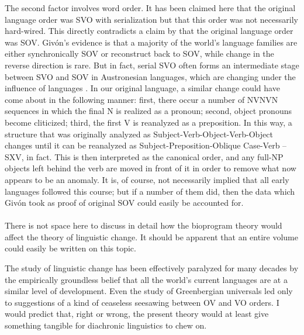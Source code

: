 The second factor involves word order. It has been claimed here that the original language order was SVO with serialization but that this order was not necessarily hard-wired. This directly contradicts a claim by \citet[Chapter~7]{Givón1979} that the original language order was SOV. Givón's evidence is that a majority of the world's language families are either synchronically SOV or reconstruct back to SOV, while change in the reverse direction is rare. But in fact, serial SVO often forms an intermediate stage between SVO and SOV in Austro\-nesian languages, which are changing under the influence of  languages \citep{Bradshaw1979}. In our original language, a similar change could have come about in the following manner: first, there occur a number of NVNVN sequences in which the final N is realized as a pronoun; second, object pronouns become cliticized; third, the first V is reanalyzed as a preposition. In this way, a structure that was originally analyzed as Subject-Verb-Object-Verb-Object changes until it can be reanalyzed as Subject-Preposition-Oblique Case-Verb -- SXV, in fact. This is then interpreted as the canonical order, and any full-NP objects left behind the verb are moved in front of it in order to remove what now appears to be an anomaly. It is, of course, not necessarily implied that all early languages followed this course; but if a number of them did, then the data which Givón took as proof of original SOV could easily be accounted for.\\\\

There is not space here to discuss in detail how the bioprogram theory would affect the theory of linguistic change. It should be apparent that an entire volume could easily be written on this topic.

The study of linguistic change has been effectively paralyzed for many decades by the empirically groundless belief that all the world's current languages are at a similar level of development. Even the study of Greenbergian universals led only to suggestions of a kind of ceaseless seesawing between OV and VO orders. I would predict that, right or wrong, the present theory would at least give something tangible for diachronic linguistics to chew on.

